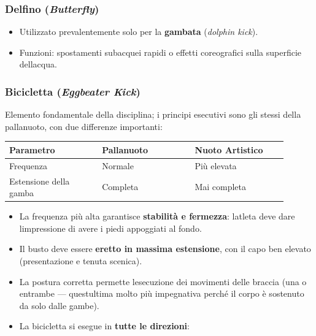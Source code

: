 \documentclass[a4paper,11pt]{article}
\providecommand{\tightlist}{%
  \setlength{\itemsep}{0pt}\setlength{\parskip}{0pt}}
\begin{document}
\subsubsection{\texorpdfstring{Delfino
            (\emph{Butterfly})}{Delfino (Butterfly)}}\label{delfino-butterfly}

\begin{itemize}
      \tightlist
      \item
            Utilizzato prevalentemente solo per la \textbf{gambata} (\emph{dolphin
                  kick}).
      \item
            Funzioni: spostamenti subacquei rapidi o effetti coreografici sulla
            superficie dell\textquotesingle acqua.
\end{itemize}

\subsubsection{\texorpdfstring{Bicicletta (\emph{Eggbeater
                  Kick})}{Bicicletta (Eggbeater Kick)}}\label{bicicletta-eggbeater-kick}

Elemento fondamentale della disciplina; i principi esecutivi sono gli
stessi della pallanuoto, con due differenze importanti:

\begin{longtable}[]{@{}p{0.30\linewidth}p{0.30\linewidth}p{0.30\linewidth}@{}}
      \toprule\noalign{}
      Parametro              & Pallanuoto & Nuoto Artistico \\
      \midrule\noalign{}
      \endhead
      \bottomrule\noalign{}
      \endlastfoot
      Frequenza              & Normale    & Più elevata     \\
      Estensione della gamba & Completa   & Mai completa    \\
\end{longtable}

\begin{itemize}
      \tightlist
      \item
            La frequenza più alta garantisce \textbf{stabilità e fermezza}:
            l\textquotesingle atleta deve dare l\textquotesingle impressione di
            avere i piedi appoggiati al fondo.
      \item
            Il busto deve essere \textbf{eretto in massima estensione}, con il
            capo ben elevato (presentazione e tenuta scenica).
      \item
            La postura corretta permette l\textquotesingle esecuzione dei
            movimenti delle braccia (una o entrambe ---
            quest\textquotesingle ultima molto più impegnativa perché il corpo è
            sostenuto da solo dalle gambe).
      \item
            La bicicletta si esegue in \textbf{tutte le direzioni}:
\end{itemize}
\end{document}
